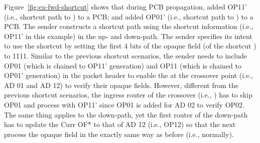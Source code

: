 \noindent Figure~\ref{fig:ex-fwd-shortcut} shows that during PCB propagation,  added OP11' (i.e., shortcut path to ) to a PCB; and  added OP01' (i.e., shortcut path to ) to a PCB. The sender constructs a shortcut path using the shortcut information (i.e., OP11' in this example) in the up- and down-path. The sender specifies its intent to use the shortcut by setting the first 4 bits of the opaque field (of the shortcut \AD) to 1111. Similar to the previous shortcut scenarios, the sender needs to include OP01 (which is chained to OP11' generation)  and OP11 (which is chained to OP01' generation) in the packet header to enable the \ADs at the crossover point (i.e., AD 01 and AD 12) to verify their opaque fields. However, different from the previous shortcut scenarios, the ingress router of the crossover \AD (i.e., ) has to skip OP01 and process with OP11' since OP01 is added for AD 02 to verify OP02. The same thing applies to the down-path, yet the first router of the down-path has to update the Curr OF* to that of AD 12 (i.e., OP12) so that the next \AD process the opaque field in the exactly same way as before (i.e., normally).

